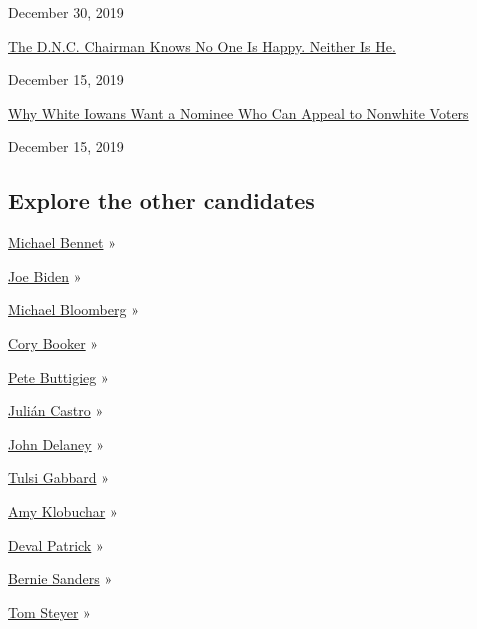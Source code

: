 December 30, 2019

\href{https://www.nytimes3xbfgragh.onion/2019/12/15/us/politics/democrats-2020-tom-perez.html}{The
D.N.C. Chairman Knows No One Is Happy. Neither Is He.}

December 15, 2019

\href{https://www.nytimes3xbfgragh.onion/2019/12/15/us/politics/iowa-2020-candidates.html}{Why
White Iowans Want a Nominee Who Can Appeal to Nonwhite Voters}

December 15, 2019

\hypertarget{explore-the-other-candidates}{%
\subsection{Explore the other
candidates}\label{explore-the-other-candidates}}

\href{https://www.nytimes3xbfgragh.onion/interactive/2020/us/elections/michael-bennet.html}{Michael
Bennet} »

\href{https://www.nytimes3xbfgragh.onion/interactive/2020/us/elections/joe-biden.html}{Joe
Biden} »

\href{https://www.nytimes3xbfgragh.onion/interactive/2020/us/elections/michael-bloomberg.html}{Michael
Bloomberg} »

\href{https://www.nytimes3xbfgragh.onion/interactive/2020/us/elections/cory-booker.html}{Cory
Booker} »

\href{https://www.nytimes3xbfgragh.onion/interactive/2020/us/elections/pete-buttigieg.html}{Pete
Buttigieg} »

\href{https://www.nytimes3xbfgragh.onion/interactive/2020/us/elections/julian-castro.html}{Julián
Castro} »

\href{https://www.nytimes3xbfgragh.onion/interactive/2020/us/elections/john-delaney.html}{John
Delaney} »

\href{https://www.nytimes3xbfgragh.onion/interactive/2020/us/elections/tulsi-gabbard.html}{Tulsi
Gabbard} »

\href{https://www.nytimes3xbfgragh.onion/interactive/2020/us/elections/amy-klobuchar.html}{Amy
Klobuchar} »

\href{https://www.nytimes3xbfgragh.onion/interactive/2020/us/elections/deval-patrick.html}{Deval
Patrick} »

\href{https://www.nytimes3xbfgragh.onion/interactive/2020/us/elections/bernie-sanders.html}{Bernie
Sanders} »

\href{https://www.nytimes3xbfgragh.onion/interactive/2020/us/elections/tom-steyer.html}{Tom
Steyer} »

